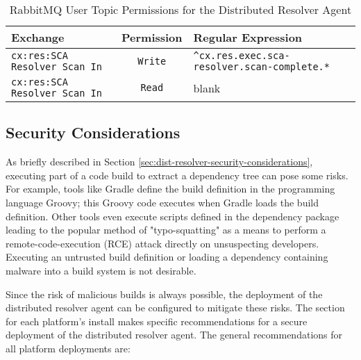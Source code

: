 \begin{table}[ht]
  \caption{RabbitMQ User Topic Permissions for the Distributed Resolver Agent}  
  \label{tab:agent-mq-topic-perms}      
  \begin{tabularx}{\textwidth}{lcl}
      \toprule
      \textbf{Exchange} & \textbf{Permission} & \textbf{Regular Expression} \\
      \midrule
      \texttt{cx:res:SCA Resolver Scan In} & \texttt{Write} & \texttt{\^{}cx.res.exec.sca-resolver.scan-complete.*}\\
      \midrule
      \texttt{cx:res:SCA Resolver Scan In} & \texttt{Read} & blank \\
      \midrule
      \bottomrule
  \end{tabularx}
\end{table}


\subsection{Security Considerations}\label{sec:resolver-agent-security}

As briefly described in Section \ref{sec:dist-resolver-security-considerations}, executing
part of a code build to extract a dependency tree can pose some risks. For example,
tools like Gradle define the build definition in the programming language Groovy; this Groovy
code executes when Gradle loads the build definition.  Other tools even execute scripts defined
in the dependency package leading to the popular method of "typo-squatting" as a means to
perform a remote-code-execution (RCE) attack directly on unsuspecting developers.  Executing an
untrusted build definition or loading a dependency containing malware into a build system is
not desirable.

Since the risk of malicious builds is always possible, the deployment of the distributed resolver agent
can be configured to mitigate these risks.  The section for each platform's install makes specific
recommendations for a secure deployment of the distributed resolver agent.  The general recommendations
for all platform deployments are:

